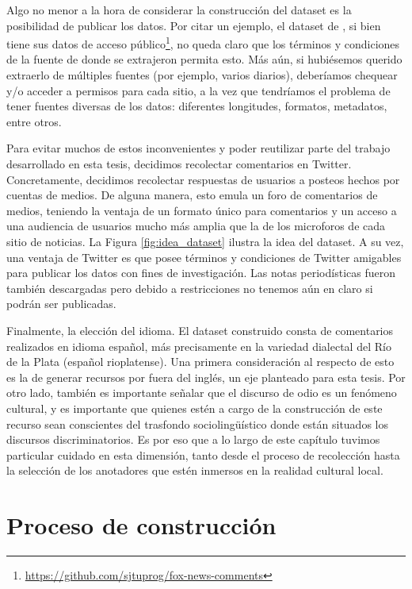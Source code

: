 Algo no menor a la hora de considerar la construcción del dataset es la posibilidad de publicar los datos. Por citar un ejemplo, el dataset de \citet{gao-huang-2017-detecting}, si bien tiene sus datos de acceso público\footnote{\url{https://github.com/sjtuprog/fox-news-comments}}, no queda claro que los términos y condiciones de la fuente de donde se extrajeron permita esto. Más aún, si hubiésemos querido extraerlo de múltiples fuentes (por ejemplo, varios diarios), deberíamos chequear y/o acceder a permisos para cada sitio, a la vez que tendríamos el problema de tener fuentes diversas de los datos: diferentes longitudes, formatos, metadatos, entre otros.

Para evitar muchos de estos inconvenientes y poder reutilizar parte del trabajo desarrollado en esta tesis, decidimos recolectar comentarios en Twitter. Concretamente, decidimos recolectar respuestas de usuarios a posteos hechos por cuentas de medios. De alguna manera, esto emula un foro de comentarios de medios, teniendo la ventaja de un formato único para comentarios y un acceso a una audiencia de usuarios mucho más amplia que la de los microforos de cada sitio de noticias. La Figura \ref{fig:idea_dataset} ilustra la idea del dataset. A su vez, una ventaja de Twitter es que posee términos y condiciones de Twitter amigables para publicar los datos con fines de investigación. Las notas periodísticas fueron también descargadas pero debido a restricciones no tenemos aún en claro si podrán ser publicadas.

Finalmente, la elección del idioma. El dataset construido consta de comentarios realizados en idioma español, más precisamente en la variedad dialectal del Río de la Plata (español rioplatense). Una primera consideración al respecto de esto es la de generar recursos por fuera del inglés, un eje planteado para esta tesis. Por otro lado, también es importante señalar que el discurso de odio es un fenómeno cultural, y es importante que quienes estén a cargo de la construcción de este recurso sean conscientes del trasfondo sociolingüístico donde están situados los discursos discriminatorios. Es por eso que a lo largo de este capítulo tuvimos particular cuidado en esta dimensión, tanto desde el proceso de recolección hasta la selección de los anotadores que estén inmersos en la realidad cultural local.


\section{Proceso de construcción}

